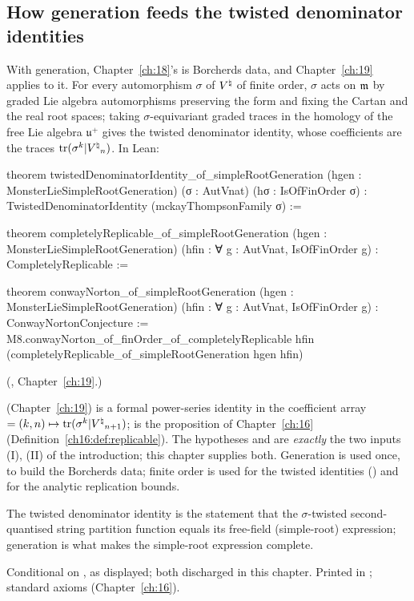 \subsection{How generation feeds the twisted denominator identities}

With generation, Chapter~\ref{ch:18}'s  is Borcherds data, and
Chapter~\ref{ch:19} applies to it.  For every automorphism $\sigma$ of ${V^{\natural}}$ of finite order, $\sigma$ acts on $\mathfrak m$
by graded Lie algebra automorphisms preserving the form and fixing the Cartan and the real root spaces; taking
$\sigma$-equivariant graded traces in the homology of the free Lie algebra $\mathfrak u^+$ gives the twisted denominator
identity, whose coefficients are the traces $\operatorname{tr}(\sigma^k|{V^{\natural}}_n)$.  In Lean:
\begin{leancode}
theorem twistedDenominatorIdentity_of_simpleRootGeneration (hgen : MonsterLieSimpleRootGeneration)
    (σ : AutVnat) (hσ : IsOfFinOrder σ) : TwistedDenominatorIdentity (mckayThompsonFamily σ) :=

theorem completelyReplicable_of_simpleRootGeneration (hgen : MonsterLieSimpleRootGeneration)
    (hfin : ∀ g : AutVnat, IsOfFinOrder g) : CompletelyReplicable :=

theorem conwayNorton_of_simpleRootGeneration (hgen : MonsterLieSimpleRootGeneration)
    (hfin : ∀ g : AutVnat, IsOfFinOrder g) : ConwayNortonConjecture :=
  M8.conwayNorton_of_finOrder_of_completelyReplicable hfin
    (completelyReplicable_of_simpleRootGeneration hgen hfin)
\end{leancode}
(, Chapter~\ref{ch:19}.)
\begin{dictionary}
 (Chapter~\ref{ch:19}) is a formal power-series identity in the coefficient array
 $=(k,n)\mapsto\operatorname{tr}(\sigma^k|{V^{\natural}}_{n+1})$;  is the proposition of
Chapter~\ref{ch:16} (Definition~\ref{ch16:def:replicable}).  The hypotheses  and  are \emph{exactly} the two
inputs (I), (II) of the introduction; this chapter supplies both.  Generation is used once, to build the Borcherds data;
finite order is used for the twisted identities () and for the analytic replication bounds.
\end{dictionary}
\begin{physics}
The twisted denominator identity is the statement that the $\sigma$-twisted second-quantised string partition function
equals its free-field (simple-root) expression; generation is what makes the simple-root expression complete.
\end{physics}
\begin{status}
Conditional on ,  as displayed; both discharged in this chapter.  Printed in
; standard axioms (Chapter~\ref{ch:16}).
\end{status}

